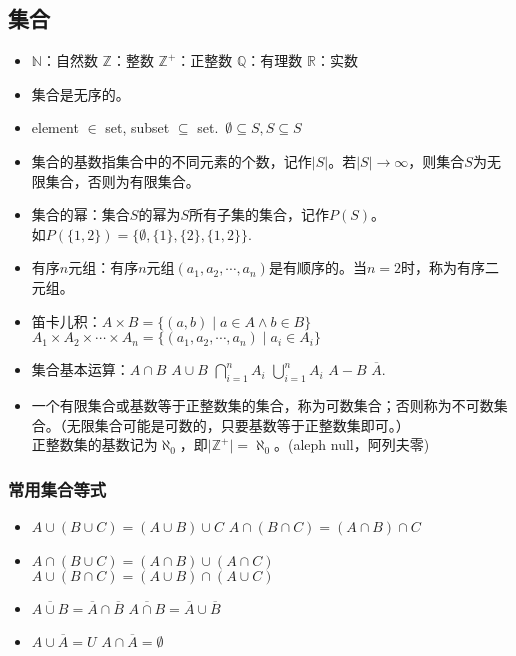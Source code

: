 \subsection{集合}
\begin{itemize}
    \item $\mathbb{N}$：自然数 \quad $\mathbb{Z}$：整数 \quad $\mathbb{Z^+}$：正整数 \quad $\mathbb{Q}$：有理数 \quad $\mathbb{R}$：实数
    \item 集合是无序的。
    \item element $\in$ set, subset $\subseteq$ set.\, $\emptyset \subseteq S, S \subseteq S$
    \item 集合的基数指集合中的不同元素的个数，记作$\lvert S \rvert$。若$\lvert S \rvert \to \infty$，则集合$S$为无限集合，否则为有限集合。
    \item 集合的幂：集合$S$的幂为$S$所有子集的集合，记作$P(S)$。\\ 如$P(\{1,2\}) = \{\emptyset, \{1\}, \{2\}, \{1,2\}\}$.
    \item 有序$n$元组：有序$n$元组$(a_1, a_2, \cdots, a_n)$是有顺序的。当$n=2$时，称为有序二元组。
    \item 笛卡儿积：$A \times B = \{(a,b) \mid a \in A \land b \in B\}$ \\ $A_1 \times A_2 \times \cdots \times A_n = \{(a_1, a_2,\cdots, a_n) \mid a_i \in A_i \}$
    \item 集合基本运算：$A \cap B$ \quad $A \cup B$ \quad $\displaystyle \bigcap _{i=1}^n A_i$ \quad $\displaystyle \bigcup _{i=1}^n A_i$ \quad $A - B$ \quad $\overline A$.
    \item 一个有限集合或基数等于正整数集的集合，称为可数集合；否则称为不可数集合。（无限集合可能是可数的，只要基数等于正整数集即可。）\\ 正整数集的基数记为$\aleph_0$，即$\lvert \mathbb{Z^+} \rvert = \aleph_0$。(aleph null，阿列夫零)
\end{itemize}

\subsubsection*{常用集合等式}
\begin{itemize}
    \item $A \cup (B \cup C) = (A \cup B) \cup C$ \quad $A \cap (B \cap C) = (A \cap B) \cap C$
    \item $A \cap (B \cup C) = (A \cap B) \cup (A \cap C)$ \quad $A \cup (B \cap C) = (A \cup B) \cap (A \cup C)$
    \item $\overline{A \cup B} = \overline A \cap \overline B$ \quad $\overline{A \cap B} = \overline A \cup \overline B$
    \item $A \cup \overline A = U$ \quad $A \cap \overline A = \emptyset$
\end{itemize}

